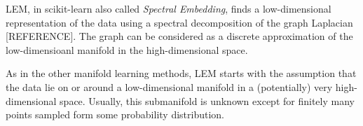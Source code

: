 LEM, in scikit-learn also called \textit{Spectral Embedding}, finds a low-dimensional representation of the data using a spectral decomposition of the graph Laplacian [REFERENCE].
The graph can be considered as a discrete approximation of the low-dimensioanl manifold in the high-dimensional space.

As in the other manifold learning methods, LEM starts with the assumption that the data lie on or around a low-dimensional manifold in a (potentially) very high-dimensional space. 
Usually, this submanifold is unknown except for finitely many points sampled form some probability distribution. 


%



%







